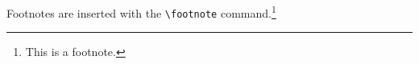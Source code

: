 \documentclass[11pt]{article}
\begin{document}
Footnotes are inserted with the \verb|\footnote| command.\footnote{This is a footnote.}




\end{document}
